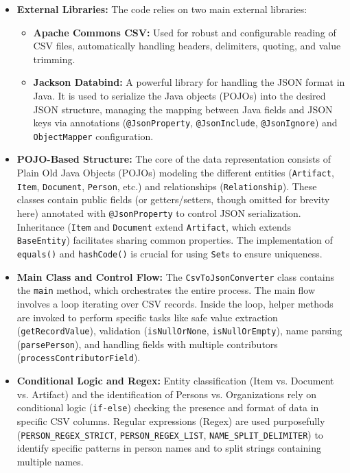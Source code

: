 \documentclass[11pt, a4paper]{article}
\begin{document}
\begin{itemize}
    \item \textbf{External Libraries:} The code relies on two main external libraries:
        \begin{itemize}
            \item \textbf{Apache Commons CSV:} Used for robust and configurable reading of CSV files, automatically handling headers, delimiters, quoting, and value trimming.
            \item \textbf{Jackson Databind:} A powerful library for handling the JSON format in Java. It is used to serialize the Java objects (POJOs) into the desired JSON structure, managing the mapping between Java fields and JSON keys via annotations (\texttt{@JsonProperty}, \texttt{@JsonInclude}, \texttt{@JsonIgnore}) and \texttt{ObjectMapper} configuration.
        \end{itemize}

    \item \textbf{POJO-Based Structure:} The core of the data representation consists of Plain Old Java Objects (POJOs) modeling the different entities (\texttt{Artifact}, \texttt{Item}, \texttt{Document}, \texttt{Person}, etc.) and relationships (\texttt{Relationship}). These classes contain public fields (or getters/setters, though omitted for brevity here) annotated with \texttt{@JsonProperty} to control JSON serialization. Inheritance (\texttt{Item} and \texttt{Document} extend \texttt{Artifact}, which extends \texttt{BaseEntity}) facilitates sharing common properties. The implementation of \texttt{equals()} and \texttt{hashCode()} is crucial for using \texttt{Set}s to ensure uniqueness.

    \item \textbf{Main Class and Control Flow:} The \texttt{CsvToJsonConverter} class contains the \texttt{main} method, which orchestrates the entire process. The main flow involves a loop iterating over CSV records. Inside the loop, helper methods are invoked to perform specific tasks like safe value extraction (\texttt{getRecordValue}), validation (\texttt{isNullOrNone}, \texttt{isNullOrEmpty}), name parsing (\texttt{parsePerson}), and handling fields with multiple contributors (\texttt{processContributorField}).

    \item \textbf{Conditional Logic and Regex:} Entity classification (Item vs. Document vs. Artifact) and the identification of Persons vs. Organizations rely on conditional logic (\texttt{if-else}) checking the presence and format of data in specific CSV columns. Regular expressions (Regex) are used purposefully (\texttt{PERSON\_REGEX\_STRICT}, \texttt{PERSON\_REGEX\_LIST}, \texttt{NAME\_SPLIT\_DELIMITER}) to identify specific patterns in person names and to split strings containing multiple names.


\end{itemize}
\end{document}
